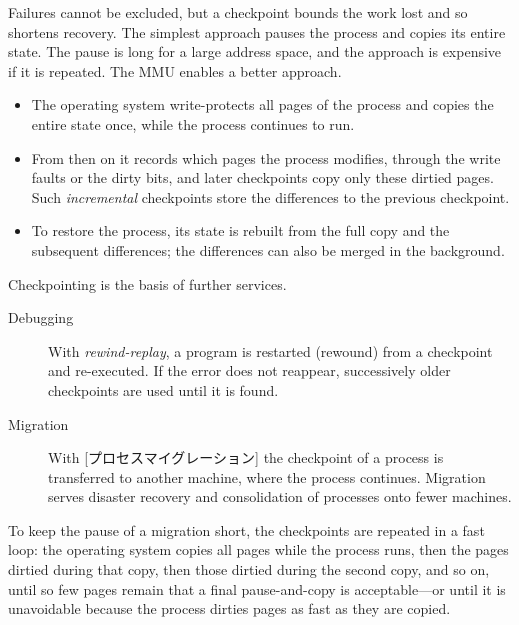 \documentclass[../main.tex]{subfiles}
\begin{document}
Failures cannot be excluded, but a checkpoint bounds the work lost and so
shortens recovery.
The simplest approach pauses the process and copies its entire state.  The
pause is long for a large address space, and the approach is expensive if
it is repeated.  The MMU enables a better approach.
\begin{itemize}
  \item The operating system write-protects all pages of the process and
    copies the entire state once, while the process continues to run.
  \item From then on it records which pages the process modifies, through
    the write faults or the dirty bits, and later checkpoints copy only
    these dirtied pages.  Such \emph{incremental} checkpoints store the
    differences to the previous checkpoint.
  \item To restore the process, its state is rebuilt from the full copy and
    the subsequent differences; the differences can also be merged in the
    background.
\end{itemize}

Checkpointing is the basis of further services.
\begin{description}
  \item[Debugging] With \emph{rewind-replay}, a program is restarted
    (rewound) from a checkpoint and re-executed.  If the error does not
    reappear, successively older checkpoints are used until it is found.
  \item[Migration] With [プロセスマイグレーション]
    the checkpoint of a process is transferred to another machine, where
    the process continues.  Migration serves disaster recovery and
    consolidation of processes onto fewer machines.
\end{description}
To keep the pause of a migration short, the checkpoints are repeated in a
fast loop: the operating system copies all pages while the process runs,
then the pages dirtied during that copy, then those dirtied during the
second copy, and so on, until so few pages remain that a final
pause-and-copy is acceptable---or until it is unavoidable because the
process dirties pages as fast as they are copied.
\end{document}
